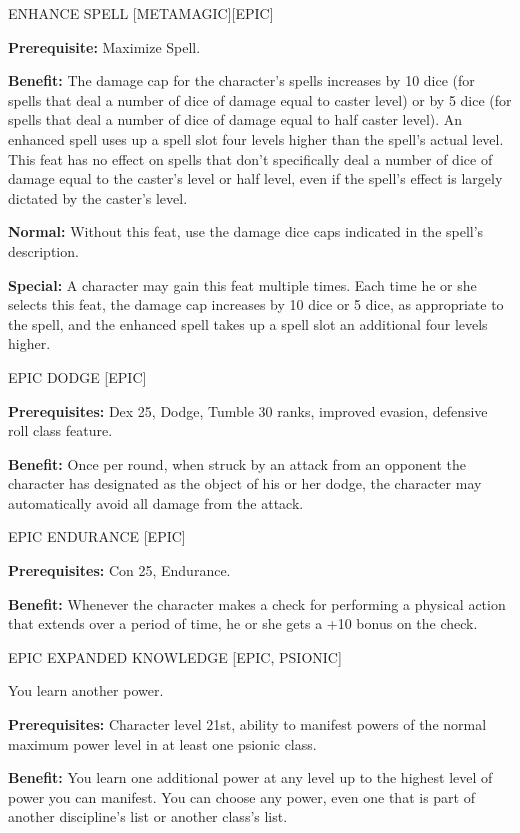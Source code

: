 \documentclass{article}
\begin{document}
\vspace{12pt}
ENHANCE SPELL [METAMAGIC][EPIC] 

\textbf{Prerequisite:} Maximize Spell. 

\textbf{Benefit:} The damage cap for the character's spells increases by 10 dice 
(for spells that deal a number of dice of damage equal to caster level) or by 5 
dice (for spells that deal a number of dice of damage equal to half caster level). 
An enhanced spell uses up a spell slot four levels higher than the spell's actual 
level. This feat has no effect on spells that don't specifically deal a number 
of dice of damage equal to the caster's level or half level, even if the spell's 
effect is largely dictated by the caster's level. 

\textbf{Normal:} Without this feat, use the damage dice caps indicated in the spell's 
description. 

\textbf{Special:} A character may gain this feat multiple times. Each time he or 
she selects this feat, the damage cap increases by 10 dice or 5 dice, as appropriate 
to the spell, and the enhanced spell takes up a spell slot an additional four levels 
higher. 

\vspace{12pt}
EPIC DODGE [EPIC] 

\textbf{Prerequisites:} Dex 25, Dodge, Tumble 30 ranks, improved evasion, defensive 
roll class feature. 

\textbf{Benefit:} Once per round, when struck by an attack from an opponent the 
character has designated as the object of his or her dodge, the character may automatically 
avoid all damage from the attack. 

\vspace{12pt}
EPIC ENDURANCE [EPIC] 

\textbf{Prerequisites:} Con 25, Endurance. 

\textbf{Benefit:} Whenever the character makes a check for performing a physical 
action that extends over a period of time, he or she gets a +10 bonus on the check. 

\vspace{12pt}
EPIC EXPANDED KNOWLEDGE [EPIC, PSIONIC]

You learn another power.

\textbf{Prerequisites:} Character level 21st, ability to manifest powers of the 
normal maximum power level in at least one psionic class.

\textbf{Benefit:} You learn one additional power at any level up to the highest 
level of power you can manifest. You can choose any power, even one that is part 
of another discipline's list or another class's list.
\end{document}
